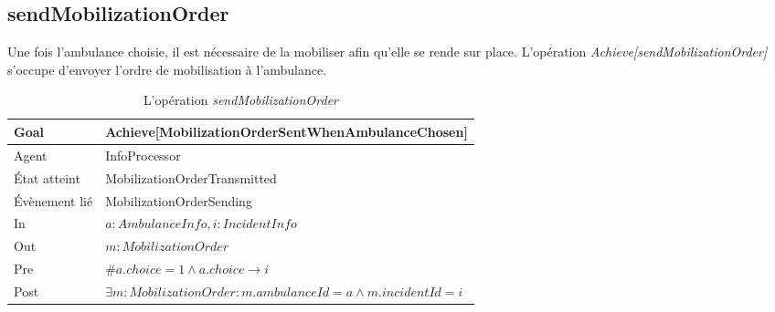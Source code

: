 \subsection{sendMobilizationOrder}

	Une fois l'ambulance choisie, il est nécessaire de la mobiliser afin 
	qu'elle se rende sur place. L'opération \textit{Achieve[sendMobilizationOrder]}
	s'occupe d'envoyer l'ordre de mobilisation à l'ambulance.
	
	
	\begin{table}[!h] \centering
		\begin{tabularx}{\textwidth}{|l|X|} \hline
			Goal & Achieve[MobilizationOrderSentWhenAmbulanceChosen] \\ \hline
			Agent & InfoProcessor \\ \hline
			État atteint & MobilizationOrderTransmitted \\ \hline
			Évènement lié & MobilizationOrderSending \\ \hline
			In & $a: AmbulanceInfo, i: IncidentInfo$ \\ \hline
			Out & $m: MobilizationOrder$ \\ \hline
			Pre & $\#a.choice = 1 \wedge a.choice \rightarrow i$ \\ \hline
			Post & $\exists m: MobilizationOrder : m.ambulanceId = a \wedge m.incidentId = i$ \\ \hline 
		\end{tabularx}
		\caption{L'opération \textit{sendMobilizationOrder}}\label{tab:op4}
	\end{table}
